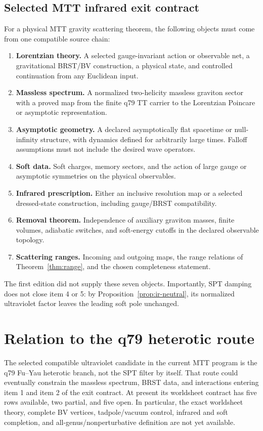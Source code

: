 \documentclass[11pt]{article}
\begin{document}
\subsection{Selected MTT infrared exit contract}

For a physical MTT gravity scattering theorem, the following objects must come
from one compatible source chain:
\begin{enumerate}
\item \textbf{Lorentzian theory.} A selected gauge-invariant action or
observable net, a gravitational BRST/BV construction, a physical state, and
controlled continuation from any Euclidean input.
\item \textbf{Massless spectrum.} A normalized two-helicity massless graviton
sector with a proved map from the finite q79 TT carrier to the Lorentzian
Poincare or asymptotic representation.
\item \textbf{Asymptotic geometry.} A declared asymptotically flat spacetime
or null-infinity structure, with dynamics defined for arbitrarily large
times. Falloff assumptions must not include the desired wave operators.
\item \textbf{Soft data.} Soft charges, memory sectors, and the action of
large gauge or asymptotic symmetries on the physical observables.
\item \textbf{Infrared prescription.} Either an inclusive resolution map or a
selected dressed-state construction, including gauge/BRST compatibility.
\item \textbf{Removal theorem.} Independence of auxiliary graviton masses,
finite volumes, adiabatic switches, and soft-energy cutoffs in the declared
observable topology.
\item \textbf{Scattering ranges.} Incoming and outgoing maps, the range
relations of Theorem~\ref{thm:range}, and the chosen completeness statement.
\end{enumerate}

The first edition did not supply these seven objects. Importantly, SPT damping
does not close item 4 or 5: by Proposition~\ref{prop:ir-neutral}, its normalized
ultraviolet factor leaves the leading soft pole unchanged.

\section{Relation to the q79 heterotic route}

The selected compatible ultraviolet candidate in the current MTT program is
the q79 Fu--Yau heterotic branch, not the SPT filter by itself. That route
could eventually constrain the massless spectrum, BRST data, and interactions
entering item 1 and item 2 of the exit contract. At present its worldsheet
contract has five rows available, two partial, and five open. In particular,
the exact worldsheet theory, complete BV vertices, tadpole/vacuum control,
infrared and soft completion, and all-genus/nonperturbative definition are not
yet available.
\end{document}
